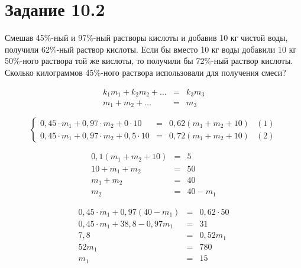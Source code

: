 \section*{Задание 10.2}

Смешав 45\%-ный и 97\%-ный растворы кислоты и добавив 10 кг чистой воды, получили 62\%-ный раствор кислоты. Если бы вместо 10 кг воды добавили 10 кг 50\%-ного раствора той же кислоты, то получили бы 72\%-ный раствор кислоты. Сколько килограммов 45\%-ного раствора использовали для получения смеси?

\begin{equation*}
    \begin{array}{rcl}
        k_1m_1 + k_2m_2 + \ldots & = & k_3m_3 \\
        m_1 + m_2 + \ldots       & = & m_3
    \end{array}
\end{equation*}

\begin{equation*}
    \left\{
    \begin{array}{lclr}
        0,45\cdot m_1 + 0,97\cdot m_2 + 0 \cdot 10  & = & 0,62(m_1 + m_2 + 10) & (1) \\
        0,45\cdot m_1 + 0,97\cdot m_2 + 0,5\cdot 10 & = & 0,72(m_1 + m_2 + 10) & (2)
    \end{array}
    \right.
\end{equation*}

\begin{equation*}
    \begin{array}{rcl}
        0,1 (m_1+m_2+10) & = & 5        \\
        10 + m_1 + m_2   & = & 50       \\
        m_1 + m_2        & = & 40       \\
        m_2              & = & 40 - m_1
    \end{array}
\end{equation*}

\begin{equation*}
    \begin{array}{rcl}
        0,45\cdot m_1 + 0,97(40-m_1)   & = & 0,62\cdot 50 \\
        0,45\cdot m_1 + 38,8 - 0,97m_1 & = & 31           \\
        7,8                            & = & 0,52m_1      \\
        52m_1                          & = & 780          \\
        m_1                            & = & 15
    \end{array}
\end{equation*}

